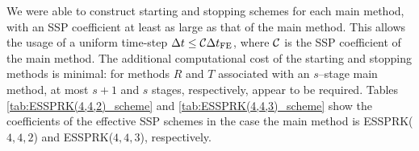 We were able to construct starting and stopping schemes for each main 
method, with an SSP coefficient at least as large as that of the main method.
This allows the usage of a uniform time-step $\Delta t \leq \mathcal{C}\Delta t_{\textnormal{FE}}$, 
where $\mathcal{C}$ is the SSP coefficient of the main method.
The additional computational cost
of the starting and stopping methods is minimal:
for methods $R$ and $T$ associated with an $s$--stage main method,
at most $s + 1$ and $s$ stages, respectively, appear to be required.
Tables \ref{tab:ESSPRK(4,4,2)_scheme} and \ref{tab:ESSPRK(4,4,3)_scheme} 
show the coefficients of the effective SSP schemes in the case the main 
method is ESSPRK($4,4,2$) and ESSPRK($4,4,3$), respectively. 

